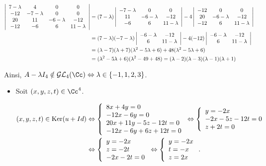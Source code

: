 {\begin{enumerate}
{\begin{align*}\ensuremath
\left|
\begin{array}{cccc}
7-\lambda&4&0&0\\
-12&-7-\lambda&0&0\\
20&11&-6-\lambda&-12\\
-12&-6&6&11-\lambda
\end{array}
\right|&=(7-\lambda)\left|
\begin{array}{ccc}
-7-\lambda&0&0\\
11&-6-\lambda&-12\\
-6&6&11-\lambda
\end{array}
\right|-4\left|
\begin{array}{ccc}
-12&0&0\\
20&-6-\lambda&-12\\
-12&6&11-\lambda
\end{array}
\right|\\
 &=(7-\lambda)(-7-\lambda)\left|
\begin{array}{cc}
-6-\lambda&-12\\
6&11-\lambda
\end{array}
\right|-4(-12)\left|
\begin{array}{cc}
-6-\lambda&-12\\
6&11-\lambda
\end{array}
\right|\\
 &=(\lambda-7)(\lambda+7)(\lambda^2-5\lambda+6)+48(\lambda^2-5\lambda+6)\\
 &=(\lambda^2-5\lambda+6)(\lambda^2-49+48)=(\lambda-2)(\lambda-3)(\lambda-1)(\lambda+1)
\end{align*}

Ainsi, $A-\lambda I_4\notin\mathcal{GL}_4(\Cc)\Leftrightarrow\lambda\in\{-1,1,2,3\}$.

\begin{itemize}
\item[- Cas $\lambda=-1$.] Soit $(x,y,z,t)\in\Cc^4$.

\begin{align*}\ensuremath
(x,y,z,t)\in\mbox{Ker}(u+Id)&\Leftrightarrow\left\{
\begin{array}{l}
8x+4y=0\\
-12x-6y=0\\
20x+11y-5z-12t=0\\
-12x-6y+6z+12t=0
\end{array}
\right.\Leftrightarrow\left\{
\begin{array}{l}
y=-2x\\
-2x-5z-12t=0\\
z+2t=0\end{array}
\right.
\\
 &\Leftrightarrow\left\{
\begin{array}{l}
y=-2x\\
z=-2t\\
-2x-2t=0
\end{array}
\right.
\Leftrightarrow
\left\{
\begin{array}{l}
y=-2x\\
t=-x\\
z=2x
\end{array}
\right..
\end{align*}


\end{itemize}}
\end{enumerate}}
